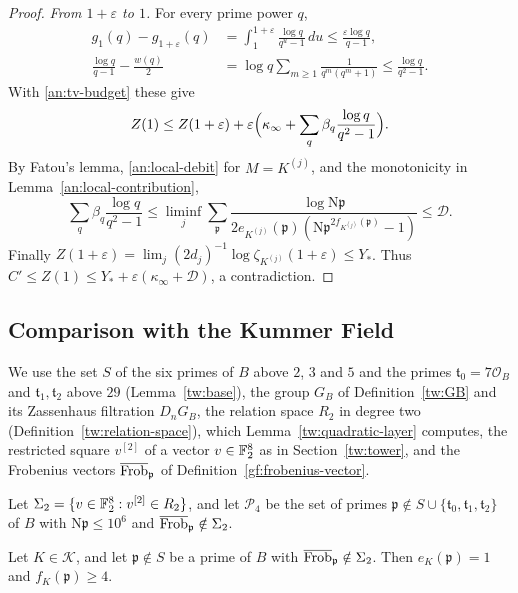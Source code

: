 \begin{proof}
\emph{From $1+\varepsilon$ to $1$.} For every prime power $q$,
\begin{align*}
 g_1(q)-g_{1+\varepsilon}(q)&=\int_1^{1+\varepsilon}\frac{\log q}{q^u-1}\,du
 \le\frac{\varepsilon\log q}{q-1},\\
 \frac{\log q}{q-1}-\frac{w(q)}2&=\log q\sum_{m\ge1}\frac1{q^m(q^m+1)}
 \le\frac{\log q}{q^2-1}.
\end{align*}
With \eqref{an:tv-budget} these give
\[
 Z(1)\le Z(1+\varepsilon)
 +\varepsilon\Bigl(\kappa_\infty+\sum_q\beta_q\frac{\log q}{q^2-1}\Bigr).
\]
By Fatou's lemma, \eqref{an:local-debit} for $M=K^{(j)}$, and the monotonicity
in Lemma~\ref{an:local-contribution},
\[
 \sum_q\beta_q\frac{\log q}{q^2-1}
 \le\liminf_j\sum_{\mathfrak p}\frac{\log\mathrm N\mathfrak p}
 {2e_{K^{(j)}}(\mathfrak p)(\mathrm N\mathfrak p^{2f_{K^{(j)}}(\mathfrak p)}-1)}
 \le\mathcal D.
\]
Finally
$Z(1+\varepsilon)=\lim_j(2d_j)^{-1}\log\zeta_{K^{(j)}}(1+\varepsilon)\le Y_*$.
Thus $C'\le Z(1)\le Y_*+\varepsilon(\kappa_\infty+\mathcal D)$, a
contradiction.
\end{proof}

\subsection{Comparison with the Kummer Field}\label{an:comparison}
We use the set $S$ of the six primes of $B$ above $2$, $3$ and $5$ and the
primes $\mathfrak t_0=7\mathcal O_B$ and $\mathfrak t_1,\mathfrak t_2$ above
$29$ (Lemma~\ref{tw:base}), the group $G_B$ of Definition~\ref{tw:GB} and
its Zassenhaus filtration $D_nG_B$, the relation space $R_2$ in degree two
(Definition~\ref{tw:relation-space}), which Lemma~\ref{tw:quadratic-layer}
computes, the restricted square $v^{[2]}$ of a vector $v\in\mathbb F_2^8$ as in
Section~\ref{tw:tower}, and the Frobenius vectors
$\overline{\operatorname{Frob}}_{\mathfrak p}$ of Definition~\ref{gf:frobenius-vector}.

\begin{definition}\label{an:P4}
Let $\Sigma_2=\{v\in\mathbb F_2^8:v^{[2]}\in R_2\}$, and let $\mathcal P_4$ be the
set of primes $\mathfrak p\notin S\cup\{\mathfrak t_0,\mathfrak
t_1,\mathfrak t_2\}$ of $B$ with $\mathrm N\mathfrak p\le10^6$ and
$\overline{\operatorname{Frob}}_{\mathfrak p}\notin\Sigma_2$.
\end{definition}

\begin{lemma}\label{an:census-degree}
Let $K\in\mathcal K$, and let $\mathfrak p\notin S$ be a prime of $B$ with
$\overline{\operatorname{Frob}}_{\mathfrak p}\notin\Sigma_2$. Then $e_K(\mathfrak p)=1$ and
$f_K(\mathfrak p)\ge4$.
\end{lemma}


